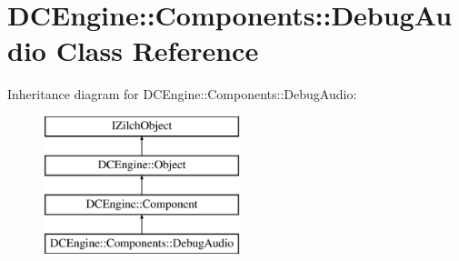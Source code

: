 \hypertarget{classDCEngine_1_1Components_1_1DebugAudio}{\section{D\-C\-Engine\-:\-:Components\-:\-:Debug\-Audio Class Reference}
\label{classDCEngine_1_1Components_1_1DebugAudio}
}
Inheritance diagram for D\-C\-Engine\-:\-:Components\-:\-:Debug\-Audio\-:\begin{figure}[H]
\begin{center}
\leavevmode
\includegraphics[height=4.000000cm]{classDCEngine_1_1Components_1_1DebugAudio}
\end{center}
\end{figure}
